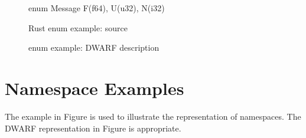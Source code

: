 \begin{figure}[ht]
\begin{nlnlisting}
    enum Message {
        F(f64),
        U(u32),
        N(i32)
    }
\end{nlnlisting}
\caption{Rust{} enum example: source}
\label{fig:rustenumexamplesource}
\end{figure}

\begin{figure}[ht]
\caption{\Rust{} enum example: DWARF description}
\label{fig:rustenumexampledwarfdescription}
\end{figure}

\clearpage
\section{Namespace Examples}
\label{app:namespaceexamples}

The  example in 
Figure 
is used 
to illustrate the representation of namespaces.
The DWARF representation in 
Figure 
is appropriate.

